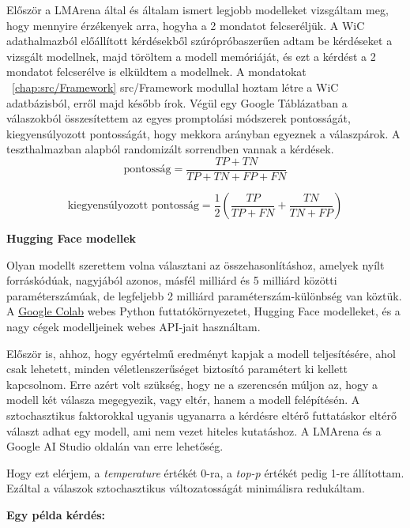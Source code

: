 \documentclass[12pt]{report}
\theoremstyle{definition}
\begin{document}
Először a LMArena által és általam ismert legjobb modelleket vizsgáltam meg, hogy mennyire érzékenyek arra, hogyha a 2 mondatot felcseréljük. A WiC adathalmazból előállított kérdésekből szúrópróbaszerűen adtam be kérdéseket a vizsgált modellnek, majd töröltem a modell memóriáját, és ezt a kérdést a 2 mondatot felcserélve is elküldtem a modellnek. A mondatokat ~\ref{chap:src/Framework} src/Framework modullal hoztam létre a WiC adatbázisból, erről majd később írok. Végül egy Google Táblázatban a válaszokból összesítettem az egyes promptolási módszerek pontosságát, kiegyensúlyozott pontosságát, hogy mekkora arányban egyeznek a válaszpárok. A teszthalmazban alapból randomizált sorrendben vannak a kérdések.
\begin{equation}
    \text{pontosság} = \frac{TP + TN}{TP + TN + FP + FN}
\end{equation}
\vspace*{0.5cm}

\begin{equation}
	\text{kiegyensúlyozott pontosság} = \frac{1}{2} \left( \frac{TP}{TP + FN} + \frac{TN}{TN + FP} \right)
\end{equation}
\vspace*{0.5cm}


  {\large\bf Hugging Face modellek}

Olyan modellt szerettem volna választani az összehasonlításhoz, amelyek nyílt forráskódúak, nagyjából azonos, másfél milliárd és 5 milliárd közötti paraméterszámúak, de legfeljebb 2 milliárd paraméterszám-különbség van köztük. A \href{https://colab.research.google.com/}{Google Colab} webes Python futtatókörnyezetet, Hugging Face modelleket, és a nagy cégek modelljeinek webes API-jait használtam.

Először is, ahhoz, hogy egyértelmű eredményt kapjak a modell teljesítésére, ahol csak lehetett, minden véletlenszerűséget biztosító paramétert ki kellett kapcsolnom. Erre azért volt szükség, hogy ne a szerencsén múljon az, hogy a modell két válasza megegyezik, vagy eltér, hanem a modell felépítésén. A sztochasztikus faktorokkal ugyanis ugyanarra a kérdésre eltérő futtatáskor eltérő választ adhat egy modell, ami nem vezet hiteles kutatáshoz. A LMArena és a Google AI Studio oldalán van erre lehetőség.

Hogy ezt elérjem, a \textit{temperature} értékét 0-ra, a \textit{top-p} értékét pedig 1-re állítottam. Ezáltal a válaszok sztochasztikus változatosságát minimálisra redukáltam.


{\large\bf Egy példa kérdés:}
\end{document}
